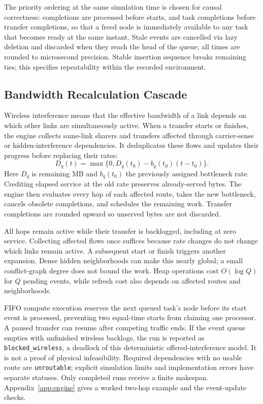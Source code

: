 \documentclass[conference]{IEEEtran}
\begin{document}
The priority ordering at the same simulation time is chosen for causal
correctness: completions are processed before starts, and task
completions before transfer completions, so that a freed node is
immediately available to any task that becomes ready at the same
instant.  Stale events are cancelled via lazy deletion and discarded
when they reach the head of the queue; all times are rounded to
microsecond precision. Stable insertion sequence breaks
remaining ties; this specifies repeatability within the recorded environment.

\subsection{Bandwidth Recalculation Cascade}

Wireless interference means that the effective bandwidth of a link depends
on which other links are simultaneously active. When a transfer starts or
finishes, the engine collects same-link sharers and transfers affected through
carrier-sense or hidden-interference dependencies. It deduplicates these
flows and updates their progress before replacing their rates:
\begin{equation}
D_q(t)=\max\{0,D_q(t_0)-b_q(t_0)(t-t_0)\}.
\label{eq:progress}
\end{equation}
Here $D_q$ is remaining MB and $b_q(t_0)$ the previously assigned bottleneck
rate. Crediting elapsed service at the old rate preserves already-served
bytes. The engine then evaluates every hop of each affected route, takes
the new bottleneck, cancels obsolete completions, and schedules the remaining
work. Transfer completions are rounded upward so unserved bytes are not
discarded.

All hops remain active while their transfer is backlogged, including at zero
service. Collecting affected flows once suffices because rate changes
do not change which links remain active.
A subsequent start or finish triggers another expansion. Dense hidden
neighborhoods can make this nearly global; a small conflict-graph degree
does not bound the work. Heap operations cost $O(\log Q)$ for $Q$ pending
events, while refresh cost also depends on affected routes and neighborhoods.

FIFO compute execution reserves the next queued task's node before its
start event is processed, preventing two equal-time starts from claiming
one processor. A paused transfer can resume after competing traffic ends.
If the event queue empties with unfinished wireless backlogs, the run is
reported as \texttt{blocked\_wireless}, a deadlock of this deterministic
offered-interference model. It is not a proof of physical infeasibility.
Required dependencies with no usable route are \texttt{unroutable}; explicit
simulation limits and implementation errors have separate statuses.
Only completed runs receive a finite makespan. Appendix~\ref{app:engine}
gives a worked two-hop example and the event-update checks.
\end{document}
